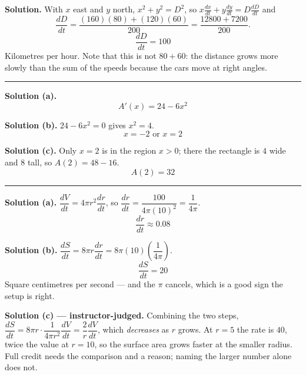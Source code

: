 \documentclass[12pt]{article}
\begin{document}

\textbf{Solution.} With $x$ east and $y$ north, $x^2 + y^2 = D^2$, so
$x\frac{dx}{dt} + y\frac{dy}{dt} = D\frac{dD}{dt}$ and
\[ \frac{dD}{dt} = \frac{(160)(80) + (120)(60)}{200} = \frac{12800 + 7200}{200}. \]
\[ \boxed{\frac{dD}{dt} = 100} \]
Kilometres per hour. Note that this is not $80 + 60$: the distance grows more
slowly than the sum of the speeds because the cars move at right angles.

\vspace{0.15cm}\noindent\rule{\linewidth}{0.2pt}


\textbf{Solution (a).}
\[ \boxed{A'(x) = 24 - 6x^2} \]

\textbf{Solution (b).} $24 - 6x^2 = 0$ gives $x^2 = 4$.
\[ \boxed{x = -2 \text{ or } x = 2} \]

\textbf{Solution (c).} Only $x = 2$ is in the region $x > 0$; there the
rectangle is $4$ wide and $8$ tall, so $A(2) = 48 - 16$.
\[ \boxed{A(2) = 32} \]

\vspace{0.15cm}\noindent\rule{\linewidth}{0.2pt}


\textbf{Solution (a).} $\dfrac{dV}{dt} = 4\pi r^2\dfrac{dr}{dt}$, so
$\dfrac{dr}{dt} = \dfrac{100}{4\pi(10)^2} = \dfrac{1}{4\pi}$.
\[ \boxed{\frac{dr}{dt} \approx 0.08} \]

\textbf{Solution (b).} $\dfrac{dS}{dt} = 8\pi r\dfrac{dr}{dt}
= 8\pi(10)\left(\dfrac{1}{4\pi}\right)$.
\[ \boxed{\frac{dS}{dt} = 20} \]
Square centimetres per second --- and the $\pi$ cancels, which is a good sign
the setup is right.

\textbf{Solution (c) --- instructor-judged.} Combining the two steps,
$\dfrac{dS}{dt} = 8\pi r\cdot\dfrac{1}{4\pi r^2}\dfrac{dV}{dt}
= \dfrac{2}{r}\dfrac{dV}{dt}$, which \emph{decreases} as $r$ grows. At $r = 5$
the rate is $40$, twice the value at $r = 10$, so the surface area grows faster
at the smaller radius. Full credit needs the comparison and a reason; naming
the larger number alone does not.
\end{document}
